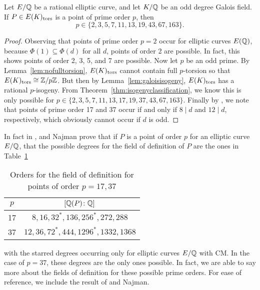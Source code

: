 \begin{lem} \label{odddegreeprime}
Let $E/\mathbb{Q}$ be a rational elliptic curve, and let $K/\mathbb{Q}$ be an odd degree Galois field. If $P \in E(K)_{\text{tors}}$ is a point of prime order $p$, then
	\[
	p \in \{ 2, 3, 5, 7, 11, 13, 19, 43, 67, 163 \}.
	\]
\end{lem}

\begin{proof} 
Observing that points of prime order $p= 2$ occur for elliptic curves $E(\mathbb{Q})$, because $\Phi(1) \subseteq \Phi(d)$ for all $d$, points of order 2 are possible. In fact, this shows points of order 2, 3, 5, and 7 are possible. Now let $p$ be an odd prime. By Lemma~\ref{lem:nofulltorsion}, $E(K)_{\text{tors}}$ cannot contain full $p$-torsion so that $E(K)_{\text{tors}} \cong \mathbb{Z}/p\mathbb{Z}$. But then by Lemma~\ref{lem:galoisisogeny}, $E(K)_{\text{tors}}$ has a rational $p$-isogeny. From Theorem~\ref{thm:isogenyclassification}, we know this is only possible for $p \in \{ 2, 3, 5, 7, 11, 13, 17, \allowbreak 19, 37, 43, 67, 163 \}$. Finally by \cite{gonzalezjimeneznajman20base}, we note that points of prime order 17 and 37 occur if and only if $8 \mid d$ and $12 \mid d$, respectively, which obviously cannot occur if $d$ is odd. 
\end{proof}


In fact in \cite{gonzalezjimeneznajman20base}, \gonjim{} and Najman prove that if $P$ is a point of order $p$ for an elliptic curve $E/\mathbb{Q}$, that the possible degrees for the field of definition of $P$ are the ones in Table~\ref{tab:order1737}
	\begin{table}[!ht]
	\centering
	\caption{Orders for the field of definition for points of order $p= 17, 37$\label{tab:order1737}}
	\begin{tabular}{cc} \hline
	$p$ & $[\mathbb{Q}(P) \colon \mathbb{Q}]$ \\ \hline
	17 & $8, 16, 32^*, 136, 256^*, 272, 288$ \\
	37 & $12, 36, 72^*, 444, 1296^*, 1332, 1368$
	\end{tabular}
	\end{table}
with the starred degrees occurring only for elliptic curves $E/\mathbb{Q}$ with CM. In the case of $p= 37$, these degrees are the only ones possible. In fact, we are able to say more about the fields of definition for these possible prime orders. For ease of reference, we include the result of \gonjim{} and Najman.


